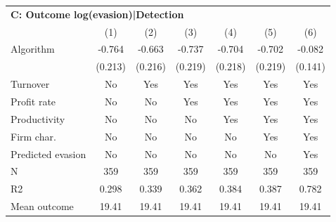 \begin{tabular}{lcccccc}
\midrule \multicolumn{7}{l}{\textbf{C: Outcome log(evasion)|Detection}} \\ \multicolumn{1}{l}{} & (1) & (2) & (3) & (4) & (5) & (6) \\ \midrule
Algorithm   &      -0.764\sym{***}&      -0.663\sym{***}&      -0.737\sym{***}&      -0.704\sym{***}&      -0.702\sym{***}&      -0.082         \\
            &     (0.213)         &     (0.216)         &     (0.219)         &     (0.218)         &     (0.219)         &     (0.141)         \\
\midrule
Turnover    &          No         &         Yes         &         Yes         &         Yes         &         Yes         &         Yes         \\
Profit rate &          No         &          No         &         Yes         &         Yes         &         Yes         &         Yes         \\
Productivity&          No         &          No         &          No         &         Yes         &         Yes         &         Yes         \\
Firm char.  &          No         &          No         &          No         &          No         &         Yes         &         Yes         \\
Predicted evasion&          No         &          No         &          No         &          No         &          No         &         Yes         \\
N           &         359         &         359         &         359         &         359         &         359         &         359         \\
R2          &       0.298         &       0.339         &       0.362         &       0.384         &       0.387         &       0.782         \\
Mean outcome&       19.41         &       19.41         &       19.41         &       19.41         &       19.41         &       19.41         \\
\bottomrule \end{tabular}
